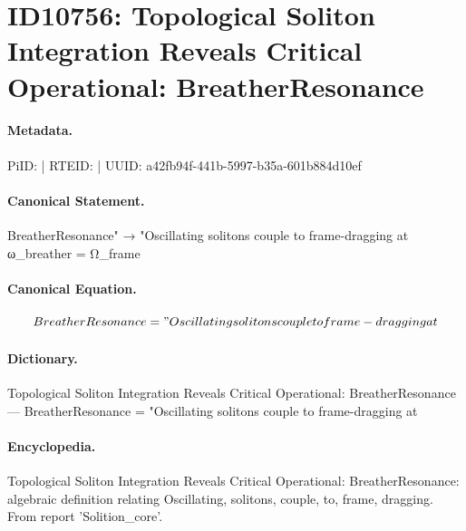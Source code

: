 \section*{ID10756: Topological Soliton Integration Reveals Critical Operational: BreatherResonance}
\paragraph{Metadata.}
PiID:  | RTEID:  | UUID: a42fb94f-441b-5997-b35a-601b884d10ef

\paragraph{Canonical Statement.}
BreatherResonance" → "Oscillating solitons couple to frame-dragging at ω\_breather = Ω\_frame

\paragraph{Canonical Equation.}
\[
BreatherResonance = "Oscillating solitons couple to frame-dragging at
\]

\paragraph{Dictionary.}
Topological Soliton Integration Reveals Critical Operational: BreatherResonance — BreatherResonance = "Oscillating solitons couple to frame-dragging at

\paragraph{Encyclopedia.}
Topological Soliton Integration Reveals Critical Operational: BreatherResonance: algebraic definition relating Oscillating, solitons, couple, to, frame, dragging. From report 'Solition\_core'.
